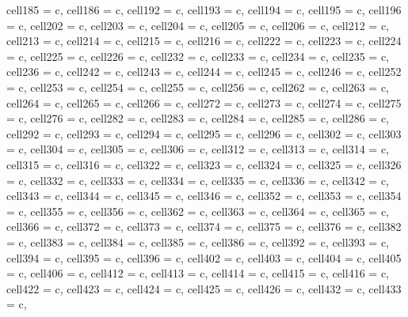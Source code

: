 \begin{small}
\begin{longtblr}[
  caption = {Objective Values Comparison},
]
{  cell{18}{5} = {c},
  cell{18}{6} = {c},
  cell{19}{2} = {c},
  cell{19}{3} = {c},
  cell{19}{4} = {c},
  cell{19}{5} = {c},
  cell{19}{6} = {c},
  cell{20}{2} = {c},
  cell{20}{3} = {c},
  cell{20}{4} = {c},
  cell{20}{5} = {c},
  cell{20}{6} = {c},
  cell{21}{2} = {c},
  cell{21}{3} = {c},
  cell{21}{4} = {c},
  cell{21}{5} = {c},
  cell{21}{6} = {c},
  cell{22}{2} = {c},
  cell{22}{3} = {c},
  cell{22}{4} = {c},
  cell{22}{5} = {c},
  cell{22}{6} = {c},
  cell{23}{2} = {c},
  cell{23}{3} = {c},
  cell{23}{4} = {c},
  cell{23}{5} = {c},
  cell{23}{6} = {c},
  cell{24}{2} = {c},
  cell{24}{3} = {c},
  cell{24}{4} = {c},
  cell{24}{5} = {c},
  cell{24}{6} = {c},
  cell{25}{2} = {c},
  cell{25}{3} = {c},
  cell{25}{4} = {c},
  cell{25}{5} = {c},
  cell{25}{6} = {c},
  cell{26}{2} = {c},
  cell{26}{3} = {c},
  cell{26}{4} = {c},
  cell{26}{5} = {c},
  cell{26}{6} = {c},
  cell{27}{2} = {c},
  cell{27}{3} = {c},
  cell{27}{4} = {c},
  cell{27}{5} = {c},
  cell{27}{6} = {c},
  cell{28}{2} = {c},
  cell{28}{3} = {c},
  cell{28}{4} = {c},
  cell{28}{5} = {c},
  cell{28}{6} = {c},
  cell{29}{2} = {c},
  cell{29}{3} = {c},
  cell{29}{4} = {c},
  cell{29}{5} = {c},
  cell{29}{6} = {c},
  cell{30}{2} = {c},
  cell{30}{3} = {c},
  cell{30}{4} = {c},
  cell{30}{5} = {c},
  cell{30}{6} = {c},
  cell{31}{2} = {c},
  cell{31}{3} = {c},
  cell{31}{4} = {c},
  cell{31}{5} = {c},
  cell{31}{6} = {c},
  cell{32}{2} = {c},
  cell{32}{3} = {c},
  cell{32}{4} = {c},
  cell{32}{5} = {c},
  cell{32}{6} = {c},
  cell{33}{2} = {c},
  cell{33}{3} = {c},
  cell{33}{4} = {c},
  cell{33}{5} = {c},
  cell{33}{6} = {c},
  cell{34}{2} = {c},
  cell{34}{3} = {c},
  cell{34}{4} = {c},
  cell{34}{5} = {c},
  cell{34}{6} = {c},
  cell{35}{2} = {c},
  cell{35}{3} = {c},
  cell{35}{4} = {c},
  cell{35}{5} = {c},
  cell{35}{6} = {c},
  cell{36}{2} = {c},
  cell{36}{3} = {c},
  cell{36}{4} = {c},
  cell{36}{5} = {c},
  cell{36}{6} = {c},
  cell{37}{2} = {c},
  cell{37}{3} = {c},
  cell{37}{4} = {c},
  cell{37}{5} = {c},
  cell{37}{6} = {c},
  cell{38}{2} = {c},
  cell{38}{3} = {c},
  cell{38}{4} = {c},
  cell{38}{5} = {c},
  cell{38}{6} = {c},
  cell{39}{2} = {c},
  cell{39}{3} = {c},
  cell{39}{4} = {c},
  cell{39}{5} = {c},
  cell{39}{6} = {c},
  cell{40}{2} = {c},
  cell{40}{3} = {c},
  cell{40}{4} = {c},
  cell{40}{5} = {c},
  cell{40}{6} = {c},
  cell{41}{2} = {c},
  cell{41}{3} = {c},
  cell{41}{4} = {c},
  cell{41}{5} = {c},
  cell{41}{6} = {c},
  cell{42}{2} = {c},
  cell{42}{3} = {c},
  cell{42}{4} = {c},
  cell{42}{5} = {c},
  cell{42}{6} = {c},
  cell{43}{2} = {c},
  cell{43}{3} = {c},
}
\end{longtblr}
\end{small}
